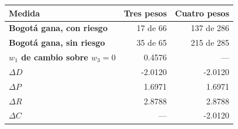 \renewcommand{\arraystretch}{1.2}
\begin{tabular}{|l|r|r|}
\hline
\rowcolor{gray!20} \textbf{Medida} & \textbf{Tres pesos} & \textbf{Cuatro pesos} \\
\hline
\textbf{Bogotá gana, con riesgo} & 17 de 66 & 137 de 286 \\
\hline
\textbf{Bogotá gana, sin riesgo} & 35 de 65 & 215 de 285 \\
\hline
\textbf{$w_1$ de cambio sobre $w_3=0$} & 0.4576 & --- \\
\hline
\textbf{$\Delta D$} & -2.0120 & -2.0120 \\
\hline
\textbf{$\Delta P$} & 1.6971 & 1.6971 \\
\hline
\textbf{$\Delta R$} & 2.8788 & 2.8788 \\
\hline
\textbf{$\Delta C$} & --- & -2.0120 \\
\hline
\end{tabular}
